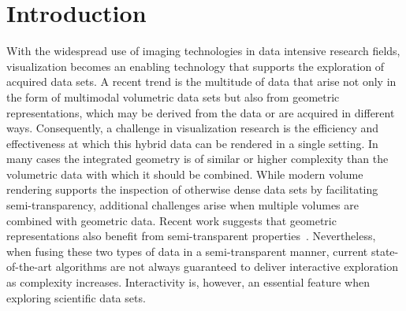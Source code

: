 \documentclass{egpubl}
\newcommand{\todo}[1]{{\color{red}\emph{(#1)}}}
\newcommand{\remark}[1]{{\color{blue!80!white}\textbf{Remark:} #1}}
\newcommand{\ab}{\mbox{A-buffer}}
\begin{document}
\section{Introduction}
\label{sec:introduction}


With the widespread use of imaging technologies in data intensive research fields, visualization becomes an enabling technology that supports the exploration of acquired data sets. 
A recent trend is the multitude of data that arise not only in the form of multimodal volumetric data sets but also from geometric representations, which may be derived from the data or are acquired in different ways.
Consequently, a challenge in visualization research is the efficiency and effectiveness at which this hybrid data can be rendered in a single setting. 
In many cases the integrated geometry is of similar or higher complexity than the volumetric data with which it should be combined. 
While modern volume rendering supports the inspection of otherwise dense data sets by facilitating semi-transparency, additional challenges arise when multiple volumes are combined with geometric data. 
Recent work suggests that geometric representations also benefit from semi-transparent properties~\cite{Guenther:2013:TOG}. 
Nevertheless, when fusing these two types of data in a semi-transparent manner, current state-of-the-art algorithms are not always guaranteed to deliver interactive exploration as complexity increases.
Interactivity is, however, an essential feature when exploring scientific data sets.
\end{document}
